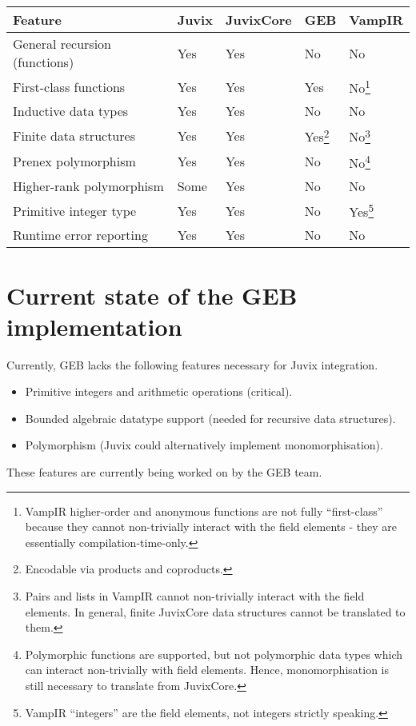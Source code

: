\vspace*{2mm}
\begin{minipage}[b]{\hsize}\centering
\begin{tabular}{lllll}
\hline
\textbf{Feature} & \textbf{Juvix} & \textbf{JuvixCore} & \textbf{GEB} & \textbf{VampIR} \\ \hline
General recursion (functions)   &  Yes   &  Yes   &  No  &   No  \\
First-class functions   &  Yes   &  Yes   &  Yes  &   No\footnote{VampIR higher-order and anonymous functions are not fully ``first-class'' because they cannot non-trivially interact with the field elements - they are essentially compilation-time-only.}  \\
Inductive data types  &  Yes   &  Yes   &  No  &   No  \\
Finite data structures  &  Yes   &  Yes   &  Yes\footnote{Encodable via products and coproducts.} & No\footnote{Pairs and lists in VampIR cannot non-trivially interact with the field elements. In general, finite JuvixCore data structures cannot be translated to them.}  \\
Prenex polymorphism  &  Yes   &  Yes   &  No  &  No\footnote{Polymorphic functions are supported, but not polymorphic data types which can interact non-trivially with field elements. Hence, monomorphisation is still necessary to translate from JuvixCore.} \\
Higher-rank polymorphism  &  Some   &  Yes   &  No  &   No  \\
Primitive integer type  &  Yes   &  Yes   &  No  &   Yes\footnote{VampIR ``integers'' are the field elements, not integers strictly speaking.} \\
Runtime error reporting  &  Yes   &  Yes   &  No  &   No \\
\hline
\end{tabular}
\end{minipage}

\section{Current state of the GEB implementation}\label{sec_geb}

Currently, GEB lacks the following features necessary for Juvix
integration.
\begin{itemize}
\item Primitive integers and arithmetic operations (critical).
\item Bounded algebraic datatype support (needed for recursive data structures).
\item Polymorphism (Juvix could alternatively implement monomorphisation).
\end{itemize}
These features are currently being worked on by the GEB team.

